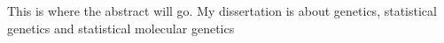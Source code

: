 \abstract
This is where the abstract will go.  My dissertation is about genetics, statistical genetics and statistical molecular genetics